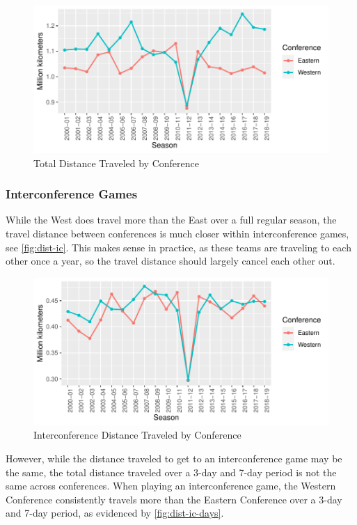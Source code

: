 \documentclass[
    12pt,
    a4paper,
    titlepage,  %
    abstract,  %
    headings=standardclasses,  %
    bibliography=totocnumbered  %
]{scrartcl}
\begin{document}
\begin{figure}[ht]
    \centering
    \includegraphics[width=\linewidth]{dist-conf}
    \caption{Total Distance Traveled by Conference}
    \label{fig:dist-conf}
\end{figure}

\subsubsection*{Interconference Games}

While the West does travel more than the East over a full regular season, the travel distance between conferences is much closer within interconference games, see \autoref{fig:dist-ic}. This makes sense in practice, as these teams are traveling to each other once a year, so the travel distance should largely cancel each other out.

\begin{figure}[ht]
    \centering
    \includegraphics[width=\linewidth]{dist-ic}
    \caption{Interconference Distance Traveled by Conference}
    \label{fig:dist-ic}
\end{figure}

However, while the distance traveled to get to an interconference game may be the same, the total distance traveled over a 3-day and 7-day period is not the same across conferences. When playing an interconference game, the Western Conference consistently travels more than the Eastern Conference over a 3-day and 7-day period, as evidenced by \autoref{fig:dist-ic-days}.
\end{document}
